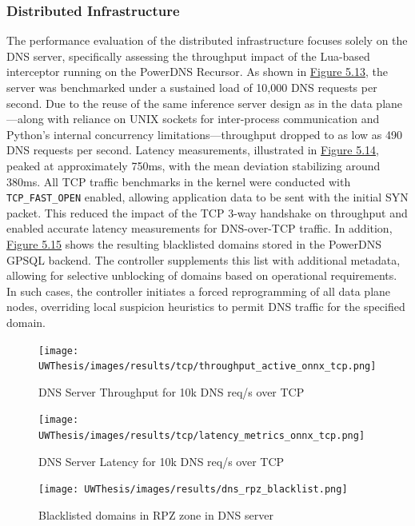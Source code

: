 \documentclass [11pt, proquest] {uwthesis}[2020/02/24]
\begin{document}
\subsubsection{Distributed Infrastructure}
The performance evaluation of the distributed infrastructure focuses solely on the DNS server, specifically assessing the throughput impact of the Lua-based interceptor running on the PowerDNS Recursor. As shown in \hyperref[fig:throughput_gsld_tcp]{Figure 5.13}, the server was benchmarked under a sustained load of 10,000 DNS requests per second. Due to the reuse of the same inference server design as in the data plane—along with reliance on UNIX sockets for inter-process communication and Python’s internal concurrency limitations—throughput dropped to as low as 490 DNS requests per second. Latency measurements, illustrated in \hyperref[fig:throughput_onnx_tcp]{Figure 5.14}, peaked at approximately 750ms, with the mean deviation stabilizing around 380ms.
All TCP traffic benchmarks in the kernel were conducted with \texttt{TCP\_FAST\_OPEN} enabled, allowing application data to be sent with the initial SYN packet. This reduced the impact of the TCP 3-way handshake on throughput and enabled accurate latency measurements for DNS-over-TCP traffic.
In addition, \hyperref[fig:dns_rpz]{Figure 5.15} shows the resulting blacklisted domains stored in the PowerDNS GPSQL backend. The controller supplements this list with additional metadata, allowing for selective unblocking of domains based on operational requirements. In such cases, the controller initiates a forced reprogramming of all data plane nodes, overriding local suspicion heuristics to permit DNS traffic for the specified domain.



\begin{figure}[H]
  \centering
  \texttt{[image: UWThesis/images/results/tcp/throughput\_active\_onnx\_tcp.png]}
  \caption{DNS Server Throughput for 10k DNS req/s over TCP}
  \label{fig:throughput_gsld_tcp}
\end{figure}

\begin{figure}[H]
  \centering
  \texttt{[image: UWThesis/images/results/tcp/latency\_metrics\_onnx\_tcp.png]}
  \caption{DNS Server Latency for 10k DNS req/s over TCP}
  \label{fig:throughput_onnx_tcp}
\end{figure}



\begin{figure}[H]
  \texttt{[image: UWThesis/images/results/dns\_rpz\_blacklist.png]}
\caption{Blacklisted domains in RPZ zone in DNS server}
  \label{fig:dns_rpz}
\end{figure}
\end{document}

